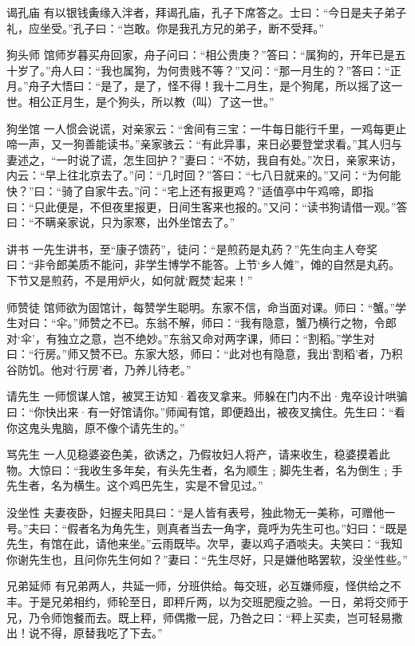\documentclass[12pt,UTF8]{ctexbook}
\begin{document}
谒孔庙
有以银钱夤缘入泮者，拜谒孔庙，孔子下席答之。士曰：“今日是夫子弟子礼，应坐受。”孔子曰：“岂敢。你是我孔方兄的弟子，断不受拜。”

狗头师
馆师岁暮买舟回家，舟子问曰：“相公贵庚？”答曰：“属狗的，开年已是五十岁了。”舟人曰：“我也属狗，为何贵贱不等？”又问：“那一月生的？”答曰：“正月。”舟子大悟曰：“是了，是了，怪不得！我十二月生，是个狗尾，所以摇了这一世。相公正月生，是个狗头，所以教（叫）了这一世。”

狗坐馆
一人惯会说谎，对亲家云：“舍间有三宝：一牛每日能行千里，一鸡每更止啼一声，又一狗善能读书。”亲家骇云：“有此异事，来日必要登堂求看。”其人归与妻述之，“一时说了谎，怎生回护？”妻曰：“不妨，我自有处。”次日，亲家来访，内云：“早上往北京去了。”问：“几时回？”答曰：“七八日就来的。”又问：“为何能快？”曰：“骑了自家牛去。”问：“宅上还有报更鸡？”适值亭中午鸡啼，即指曰：“只此便是，不但夜里报更，日间生客来也报的。”又问：“读书狗请借一观。”答曰：“不瞒亲家说，只为家寒，出外坐馆去了。”

讲书
一先生讲书，至“康子馈药”，徒问：“是煎药是丸药？”先生向主人夸奖曰：“非令郎美质不能问，非学生博学不能答。上节‘乡人傩”，傩的自然是丸药。下节又是煎药，不是用炉火，如何就‘厩焚’起来！”

师赞徒
馆师欲为固馆计，每赞学生聪明。东家不信，命当面对课。师曰：“蟹。”学生对曰：“伞。”师赞之不已。东翁不解，师曰：“我有隐意，蟹乃横行之物，令郎对‘伞’，有独立之意，岂不绝妙。”东翁又命对两字课，师曰：“割稻。”学生对曰：“行房。”师又赞不已。东家大怒，师曰：“此对也有隐意，我出‘割稻’者，乃积谷防饥。他对‘行房’者，乃养儿待老。”

请先生
一师惯谋人馆，被冥王访知·着夜叉拿来。师躲在门内不出·鬼卒设计哄骗曰：“你快出来·有一好馆请你。”师闻有馆，即便趋出，被夜叉擒住。先生曰：“看你这鬼头鬼脑，原不像个请先生的。”

骂先生
一人见稳婆姿色美，欲诱之，乃假妆妇人将产，请来收生，稳婆摸着此物。大惊曰：“我收生多年矣，有头先生者，名为顺生﹔脚先生者，名为倒生﹔手先生者，名为横生。这个鸡巴先生，实是不曾见过。”

没坐性
夫妻夜卧，妇握夫阳具曰：“是人皆有表号，独此物无一美称，可赠他一号。”夫曰：“假者名为角先生，则真者当去一角字，竟呼为先生可也。”妇曰：“既是先生，有馆在此，请他来坐。”云雨既毕。次早，妻以鸡子酒啖夫。夫笑曰：“我知你谢先生也，且问你先生何如？”妻曰：“先生尽好，只是嫌他略罢软，没坐性些。”

兄弟延师
有兄弟两人，共延一师，分班供给。每交班，必互嫌师瘦，怪供给之不丰。于是兄弟相约，师轮至日，即秤斤两，以为交班肥瘦之验。一日，弟将交师于兄，乃令师饱餐而去。既上秤，师偶撒一屁，乃咎之曰：“秤上买卖，岂可轻易撒出！说不得，原替我吃了下去。”
\end{document}
